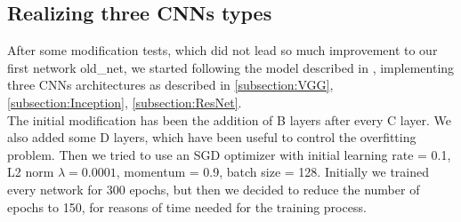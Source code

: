 \documentclass[10pt,twocolumn,letterpaper]{article}
\begin{document}
\subsection{Realizing three CNNs types}
After some modification tests, which did not lead so much improvement to our first network old\_net, we started following the model described in \cite{147}, implementing three CNNs architectures as described in \ref{subsection:VGG}, \ref{subsection:Inception}, \ref{subsection:ResNet}.\\
The initial modification has been the addition of B layers after every C layer. We also added some D layers, which have been useful to control the overfitting problem. Then we tried to use an SGD optimizer with initial learning rate = 0.1, L2 norm $\lambda=0.0001$, momentum = 0.9, batch size = 128. Initially we trained every network for 300 epochs, but then we decided to reduce the number of epochs to 150, for reasons of time needed for the training process. 
\end{document}
